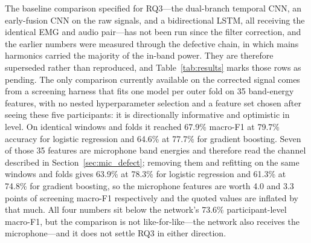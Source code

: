 \documentclass[pdflatex,sn-nature,iicol]{sn-jnl}
\begin{document}
The baseline comparison specified for RQ3---the dual-branch temporal CNN, an early-fusion CNN on the raw signals, and a bidirectional LSTM, all receiving the identical EMG and audio pair---has not been run since the filter correction, and the earlier numbers were measured through the defective chain, in which mains harmonics carried the majority of the in-band power. They are therefore superseded rather than reproduced, and Table~\ref{tab:results} marks those rows as pending. The only comparison currently available on the corrected signal comes from a screening harness that fits one model per outer fold on 35 band-energy features, with no nested hyperparameter selection and a feature set chosen after seeing these five participants: it is directionally informative and optimistic in level. On identical windows and folds it reached 67.9\% macro-F1 at 79.7\% accuracy for logistic regression and 64.6\% at 77.7\% for gradient boosting. Seven of those 35 features are microphone band energies and therefore read the channel described in Section~\ref{sec:mic_defect}; removing them and refitting on the same windows and folds gives 63.9\% at 78.3\% for logistic regression and 61.3\% at 74.8\% for gradient boosting, so the microphone features are worth 4.0 and 3.3 points of screening macro-F1 respectively and the quoted values are inflated by that much. All four numbers sit below the network's 73.6\% participant-level macro-F1, but the comparison is not like-for-like---the network also receives the microphone---and it does not settle RQ3 in either direction.
\end{document}
